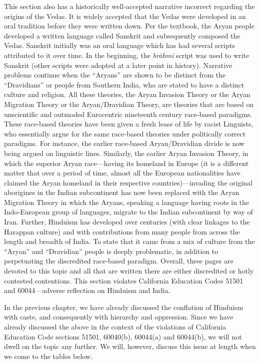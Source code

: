 This section also has a historically well-accepted narrative incorrect regarding the origins of the Vedas. It is widely accepted that the Vedas were developed in an oral tradition before they were written down. Per the textbook, the Aryan people developed a written language called Sanskrit and subsequently composed the Vedas. Sanskrit initially was an oral language which has had several scripts attributed to it over time. In the beginning, the \textit{brāhmi} script was used to write Sanskrit (other scripts were adopted at a later point in history). Narrative problems continue when the “Aryans” are shown to be distinct from the “Dravidians” or people from Southern India, who are stated to have a distinct culture and religion. All these theories, the Aryan Invasion Theory or the Aryan Migration Theory or the Aryan/Dravidian Theory, are theories that are based on unscientific and outmoded Eurocentric nineteenth century race-based paradigms. These race-based theories have been given a fresh lease of life by racist Linguists, who essentially argue for the same race-based theories under politically correct paradigms. For instance, the earlier race-based Aryan/Dravidian divide is now being argued on linguistic lines. Similarly, the earlier Aryan Invasion Theory, in which the superior Aryan race—having its homeland in Europe (it is a different matter that over a period of time, almost all the European nationalities have claimed the Aryan homeland in their respective countries)—invading the original aborigines in the Indian subcontinent has now been replaced with the Aryan Migration Theory in which the Aryans, speaking a language having roots in the Indo-European group of languages, migrate to the Indian subcontinent by way of Iran. Further, Hinduism has developed over centuries (with clear linkages to the Harappan culture) and with contributions from many people from across the length and breadth of India. To state that it came from a mix of culture from the “Aryan” and “Dravidian” people is deeply problematic, in addition to perpetuating the discredited race-based paradigm. Overall, three pages are devoted to this topic and all that are written there are either discredited or hotly contested contentions. This section violates California Education Codes 51501 and 60044—adverse reflection on Hinduism and India.  
\newpage

In the previous chapter, we have already discussed the conflation of Hinduism with caste, and consequently with hierarchy and oppression. Since we have already discussed the above in the context of the violations of California Education Code sections 51501, 60040(b), 60044(a) and 60044(b), we will not dwell on the topic any further. We will, however, discuss this issue at length when we come to the tables below.  

